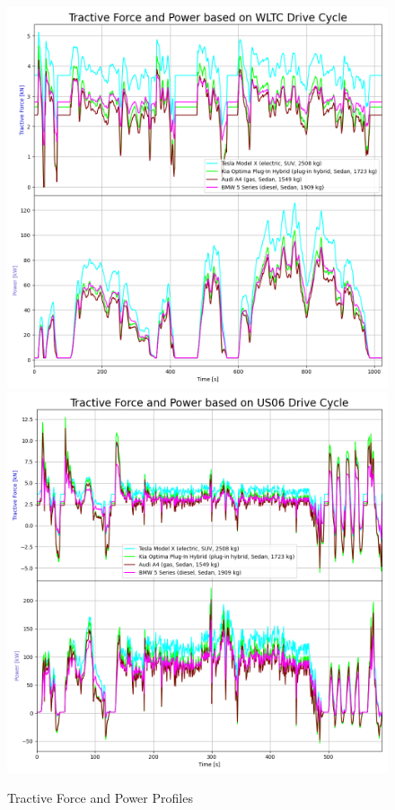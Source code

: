 	\begin{figure}[H]
		\begin{center}
			\includegraphics[width=\linewidth]{images/Tractives_WLTC.png}
			\includegraphics[width=\linewidth]{images/Tractives_US06.png}
			\caption{Tractive Force and Power Profiles}
		\end{center}
	\end{figure}

